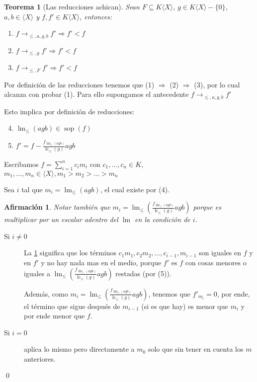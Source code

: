 \documentclass{amsbook} %
\theoremstyle{customstyle}
\newtheorem{theorem}{Teorema}[chapter]
\renewenvironment{proof}[1][\proofname]{{\bfseries #1: }}{\qed} %
\theoremstyle{factstyle}
\newtheorem{fact}{Afirmación}[theorem]
\DeclareMathOperator{\sop}{sop}
\DeclareMathOperator{\lm}{lm}
\DeclareMathOperator{\lc}{lc}
\begin{document}
\begin{theorem}[Las reducciones achican]\label{thm:→ achican}
Sean $F ⊆ K⟨X⟩$, $g ∈ K⟨X⟩ - \{0\}$, $a, b ∈ ⟨X⟩$ y $f, f' ∈ K⟨X⟩$, entonces:
\begin{enumerate}
\item $f →_{≤, a, g, b} f' ⇒ f' < f$

\item $f →_{≤, g} f' ⇒ f' < f$

\item $f →_{≤, F} f' ⇒ f' < f$
\end{enumerate}
\end{theorem}
\begin{proof}
Por definición de las reducciones tenemos que (1) $⇒$ (2) $⇒$ (3), por lo cual alcanza con probar (1). Para ello supongamos el antecedente $f →_{≤, a, g, b} f'$

Esto implica por definición de reducciones:
\begin{enumerate}
\setcounter{enumi}{3}
\item $\lm_≤(agb) ∈ \sop(f)$
\item $f' = f - \frac{f_{\lm_≤(agb)}}{\lc_≤(g)}agb$
\end{enumerate}

Escribamos $f = ∑_{i = 1}^n c_i m_i$ con $c_1, …, c_n ∈ K$, $m_1, …, m_n ∈ ⟨X⟩, m_1 > m_2 > … > m_n$

Sea $i$ tal que $m_i = \lm_≤(agb)$, el cual existe por (4).

\begin{fact}\label{fact:→ achican:3}
Notar también que $m_i = \lm_≤(\frac{f_{\lm_≤(agb)}}{\lc_≤(g)}agb)$ porque es multiplicar por un escalar adentro del $\lm$ en la condición de $i$.
\end{fact}
\begin{description}
\item[Si $i ≠ 0$] La \cref{fact:→ achican:3} significa que los términos $c_1 m_1, c_2 m_2, …, c_{i-1}, m_{i-1}$ son iguales en $f$ y en $f'$ y no hay nada mas en el medio, porque $f'$ es $f$ con cosas menores o iguales a $\lm_≤(\frac{f_{\lm_≤(agb)}}{\lc_≤(g)}agb)$ restadas (por (5)).

Además, como $m_i = \lm_≤(\frac{f_{\lm_≤(agb)}}{\lc_≤(g)}agb)$, tenemos que $f'_{m_i} = 0$, por ende, el término que sigue después de $m_{i-1}$ (si es que hay) es menor que $m_i$ y por ende menor que $f$.

\item[Si $i = 0$] aplica lo mismo pero directamente a $m_0$ solo que sin tener en cuenta los $m$ anteriores.
\end{description}

\end{proof}
\end{document}

